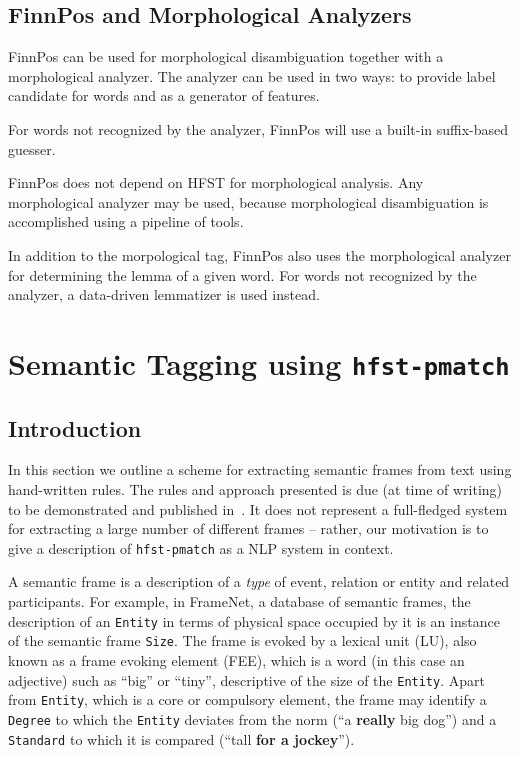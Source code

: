 \documentclass{llncs}
\begin{document}
\subsection{FinnPos and Morphological Analyzers}

FinnPos can be used for morphological disambiguation together with a
morphological analyzer. The analyzer can be used in two ways: to
provide label candidate for words and as a generator of features.

For words not recognized by the analyzer, FinnPos will use a built-in
suffix-based guesser.

FinnPos does not depend on HFST for morphological analysis. Any
morphological analyzer may be used, because morphological
disambiguation is accomplished using a pipeline of tools.

In addition to the morpological tag, FinnPos also uses the
morphological analyzer for determining the lemma of a given word. For
words not recognized by the analyzer, a data-driven lemmatizer is used
instead.

\section{Semantic Tagging using {\tt hfst-pmatch}}\label{sec:sem-tagging}

\subsection{Introduction}

In this section we outline a scheme for extracting semantic frames from text
using hand-written rules. The rules and approach presented is due (at time of
writing) to be demonstrated and published in~\cite{hardwick/2015}. It does not
represent a full-fledged system for extracting a large number of different
frames -- rather, our motivation is to give a description of
\verb+hfst-pmatch+ as a NLP system in context.

A semantic frame \cite{semantic-frame} is a description of a \emph{type} of event, relation or entity
and related participants. For example, in FrameNet,
a database of semantic frames,
the description of an \verb+Entity+ in terms of physical space occupied by it is
an instance of the semantic frame \verb+Size+. The frame is evoked by
a lexical unit (LU), also known as a frame evoking element (FEE), which is a
word (in this case an adjective)
such as ``big'' or ``tiny'', descriptive of the size of the \verb+Entity+.
Apart from \verb+Entity+, which is a core or compulsory element, the
frame may identify a \verb+Degree+ to which the \verb+Entity+ deviates
from the norm (``a \textbf{really} big dog'') and a \verb+Standard+ to
which it is compared (``tall \textbf{for a jockey}'').
\end{document}
